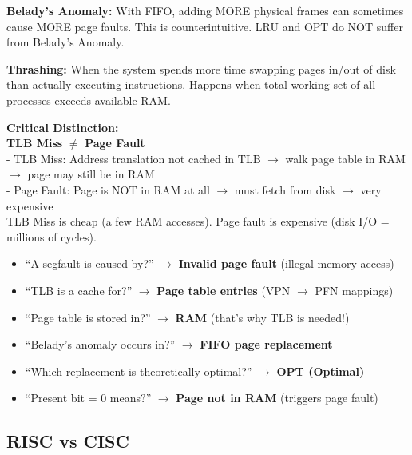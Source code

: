 \documentclass[11pt,a4paper]{article}
\newcommand{\highlight}[1]{\colorbox{yellow!50}{\textbf{#1}}}
\begin{document}
\textbf{Belady's Anomaly:} With FIFO, adding MORE physical frames can sometimes cause MORE page faults. This is counterintuitive. LRU and OPT do NOT suffer from Belady's Anomaly.

\textbf{Thrashing:} When the system spends more time swapping pages in/out of disk than actually executing instructions. Happens when total working set of all processes exceeds available RAM.

\begin{keypoint}
\textbf{Critical Distinction:}\\
\textbf{TLB Miss} $\neq$ \textbf{Page Fault}\\
- TLB Miss: Address translation not cached in TLB $\to$ walk page table in RAM $\to$ page may still be in RAM\\
- Page Fault: Page is NOT in RAM at all $\to$ must fetch from disk $\to$ very expensive\\
TLB Miss is cheap (a few RAM accesses). Page fault is expensive (disk I/O = millions of cycles).
\end{keypoint}

\begin{mcqtrap}
\begin{itemize}[noitemsep]
  \item ``A segfault is caused by?'' $\to$ \highlight{Invalid page fault} (illegal memory access)
  \item ``TLB is a cache for?'' $\to$ \highlight{Page table entries} (VPN $\to$ PFN mappings)
  \item ``Page table is stored in?'' $\to$ \highlight{RAM} (that's why TLB is needed!)
  \item ``Belady's anomaly occurs in?'' $\to$ \highlight{FIFO page replacement}
  \item ``Which replacement is theoretically optimal?'' $\to$ \highlight{OPT (Optimal)}
  \item ``Present bit = 0 means?'' $\to$ \highlight{Page not in RAM} (triggers page fault)
\end{itemize}
\end{mcqtrap}

\subsection{RISC vs CISC}
\end{document}
